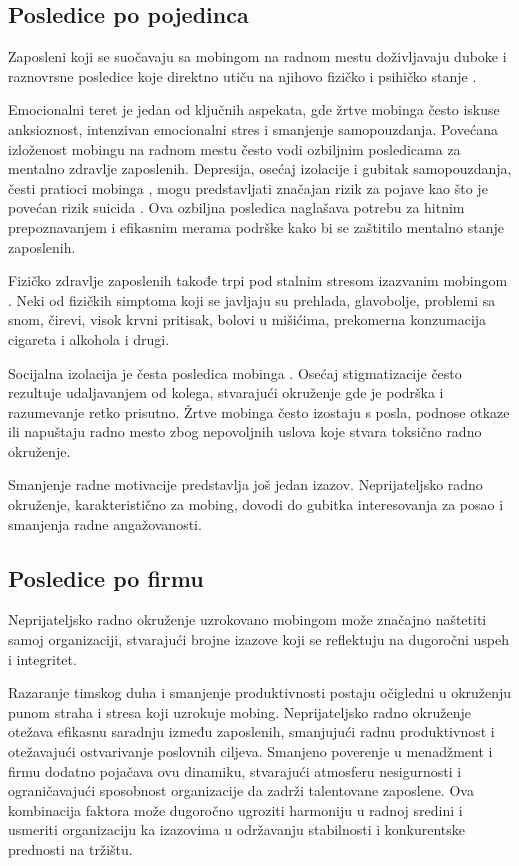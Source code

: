 \documentclass[a4paper]{article}
\begin{document}
    \subsection{Posledice po pojedinca}
        Zaposleni koji se suočavaju sa mobingom na radnom mestu doživljavaju duboke i raznovrsne posledice koje direktno utiču na njihovo fizičko i psihičko stanje \cite{leymannmobbing}.

        Emocionalni teret je jedan od ključnih aspekata, gde žrtve mobinga često iskuse anksioznost, intenzivan emocionalni stres i smanjenje samopouzdanja.
        Povećana izloženost mobingu na radnom mestu često vodi ozbiljnim posledicama za mentalno zdravlje zaposlenih.
        Depresija, osećaj izolacije i gubitak samopouzdanja, česti pratioci mobinga \cite{leymannmobbing}, mogu predstavljati značajan rizik za pojave kao što je povećan rizik suicida \cite{ERGIN2023115595}.
        Ova ozbiljna posledica naglašava potrebu za hitnim prepoznavanjem i efikasnim merama podrške kako bi se zaštitilo mentalno stanje zaposlenih.

        Fizičko zdravlje zaposlenih takođe trpi pod stalnim stresom izazvanim mobingom \cite{CELEP20124761}.
        Neki od fizičkih simptoma koji se javljaju su prehlada, glavobolje, problemi sa snom, čirevi, visok krvni pritisak, bolovi u mišićima, prekomerna konzumacija cigareta i alkohola i drugi.
        
        Socijalna izolacija je česta posledica mobinga \cite{leymannmobbing}. Osećaj stigmatizacije često rezultuje udaljavanjem od kolega, stvarajući okruženje gde je podrška i razumevanje retko prisutno. Žrtve mobinga često izostaju s posla, podnose otkaze ili napuštaju radno mesto zbog nepovoljnih uslova koje stvara toksično radno okruženje.
        
        Smanjenje radne motivacije predstavlja još jedan izazov. Neprijateljsko radno okruženje, karakteristično za mobing, dovodi do gubitka interesovanja za posao i smanjenja radne angažovanosti.
    \subsection{Posledice po firmu}
        Neprijateljsko radno okruženje uzrokovano mobingom može značajno naštetiti samoj organizaciji,
        stvarajući brojne izazove koji se reflektuju na dugoročni uspeh i integritet.

        Razaranje timskog duha i smanjenje produktivnosti postaju očigledni u okruženju punom straha i stresa koji uzrokuje mobing.
        Neprijateljsko radno okruženje otežava efikasnu saradnju između zaposlenih, smanjujući radnu produktivnost i otežavajući ostvarivanje poslovnih ciljeva.
        Smanjeno poverenje u menadžment i firmu dodatno pojačava ovu dinamiku, stvarajući atmosferu nesigurnosti i ograničavajući sposobnost organizacije da zadrži talentovane zaposlene.
        Ova kombinacija faktora može dugoročno ugroziti harmoniju u radnoj sredini i usmeriti organizaciju ka izazovima u održavanju stabilnosti i konkurentske prednosti na tržištu.
        
\end{document}
